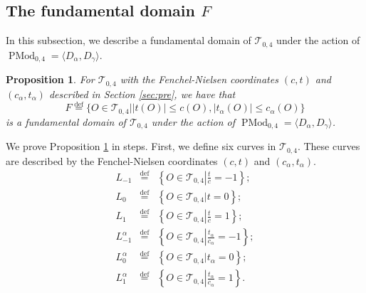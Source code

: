 \documentclass[UTF8]{amsart}
\newtheorem{proposition}[theorem]{Proposition}
\numberwithin{equation}{section}
\theoremstyle{definition}
\theoremstyle{example}
\theoremstyle{remark}
\DeclareMathOperator{\pmodo}{PMod}
\begin{document}
\subsection{The fundamental domain $F$}
In this subsection, we describe a fundamental domain of $\mathcal{T}_{0,4}$ under the action of $\pmodo_{0,4}=\langle D_{\alpha}, D_{\gamma} \rangle$. 
\begin{proposition}
 For $\mathcal{T}_{0,4}$ with the Fenchel-Nielsen coordinates $(c,t)$ and $(c_{\alpha}, t_{\alpha})$ described in Section \ref{sec:pre}, we have that
 \[
  F \overset{\mathrm{def}}{=}\{ O \in \mathcal{T}_{0,4} | |t(O)| \le c(O), |t_{\alpha}(O)| \le c_{\alpha}(O) \}
 \]
 is a fundamental domain of $\mathcal{T}_{0,4}$ under the action of $\pmodo_{0,4} = \langle D_{\alpha}, D_{\gamma} \rangle$. 

 \label{prop:fundamental}
\end{proposition}
We prove Proposition \ref{prop:fundamental} in steps. 
First, we define six curves in $\mathcal{T}_{0,4}$. These curves are described by the Fenchel-Nielsen coordinates $(c,t)$ and $(c_{\alpha}, t_{\alpha})$. 
\begin{eqnarray*}
 L_{-1} & \overset{\mathrm{def}}{=} & \left\{ O \in \mathcal{T}_{0,4} \left| \frac{t}{c} = -1 \right. \right\}; \\
 L_{0} & \overset{\mathrm{def}}{=} & \left\{ O \in \mathcal{T}_{0,4} | t = 0 \right\}; \\
 L_{1} & \overset{\mathrm{def}}{=} & \left\{ O \in \mathcal{T}_{0,4} \left| \frac{t}{c} = 1 \right. \right\}; \\
 L_{-1}^{\alpha} & \overset{\mathrm{def}}{=} & \left\{ O \in \mathcal{T}_{0,4} \left| \frac{t_{\alpha}}{c_{\alpha}} = -1 \right. \right\}; \\
 L_{0}^{\alpha} & \overset{\mathrm{def}}{=} & \left\{ O \in \mathcal{T}_{0,4} | t_{\alpha} = 0 \right\}; \\
 L_{1}^{\alpha} & \overset{\mathrm{def}}{=} & \left\{ O \in \mathcal{T}_{0,4} \left| \frac{t_{\alpha}}{c_{\alpha}} = 1 \right. \right\}. 
\end{eqnarray*}
\end{document}
